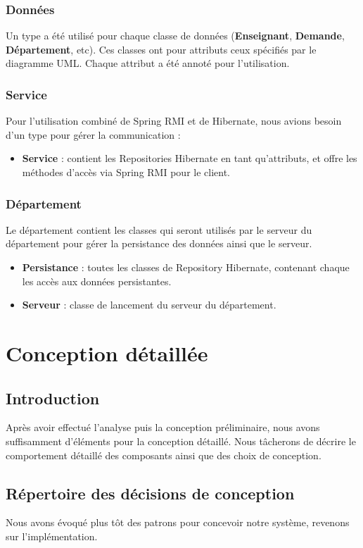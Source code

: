 \documentclass[a4paper,11pt]{article}
\begin{document}
\subsubsection{Données}
Un type a été utilisé pour chaque classe de données (\textbf{Enseignant}, \textbf{Demande}, \textbf{Département}, etc). Ces classes ont pour attributs ceux spécifiés par le diagramme UML. Chaque attribut a été annoté pour l'utilisation.
\subsubsection{Service}
Pour l'utilisation combiné de Spring RMI et de Hibernate, nous avions besoin d'un type pour gérer la communication : 
\begin{itemize}
\item \textbf{Service} : contient les Repositories Hibernate en tant qu'attributs, et offre les méthodes d'accès via Spring RMI pour le client.
\end{itemize}
\subsubsection{Département}
Le département contient les classes qui seront utilisés par le serveur du département pour gérer la persistance des données ainsi que le serveur.
\begin{itemize}
\item \textbf{Persistance} : toutes les classes de Repository Hibernate, contenant chaque les accès aux données persistantes.
\item \textbf{Serveur} : classe de lancement du serveur du département.
\end{itemize}

\section{Conception détaillée}
\subsection{Introduction}
Après avoir effectué l'analyse puis la conception préliminaire, nous avons suffisamment d'éléments pour la conception détaillé. Nous tâcherons de décrire le comportement détaillé des composants ainsi que des choix de conception.
\subsection{Répertoire des décisions de conception}
Nous avons évoqué plus tôt des patrons pour concevoir notre système, revenons sur l'implémentation.
\end{document}
